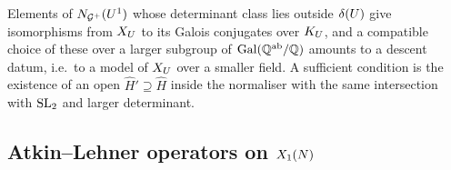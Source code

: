 \begin{remark}\label{rem:descent}
Elements of $N_{\mathcal{G}^{+}}(U^{1})$ whose determinant class lies
outside $\delta(U)$ give isomorphisms from $X_{U}$ to its Galois
conjugates over $K_{U}$, and a compatible choice of these over
a larger subgroup of $\operatorname{Gal}(\mathbb{Q}^{\mathrm{ab}}/\mathbb{Q})$ amounts to a descent datum,
i.e.\ to a model of $X_{U}$ over a smaller field. A sufficient
condition is the existence of an open $\hat H' \supseteq \hat H$ inside the
normaliser with the same intersection with $\SL{2}{}$ and larger
determinant.
\end{remark}

\subsection{Atkin--Lehner operators on $X_{1}(N)$}


